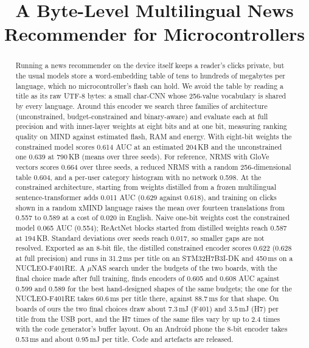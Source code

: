 \documentclass{llncs}
\begin{document}
\title{A Byte-Level Multilingual News Recommender for Microcontrollers}
\author{}
\authorrunning{}
\institute{}
\maketitle
\pagestyle{empty}
\thispagestyle{empty}

\begin{abstract}
Running a news recommender on the device itself keeps a reader's clicks private,
but the usual models store a word-embedding table of tens to hundreds of megabytes
per language, which no microcontroller's flash can hold. We avoid the table by
reading a title as its raw UTF-8 bytes: a small char-CNN whose 256-value
vocabulary is shared by every language. Around this encoder we search three
families of architecture (unconstrained, budget-constrained and binary-aware) and
evaluate each at full precision and with inner-layer weights at eight bits and at
one bit, measuring ranking quality on MIND against estimated flash, RAM and
energy. With eight-bit weights the constrained model scores 0.614 AUC at an
estimated 204\,KB and the unconstrained one 0.639 at 790\,KB (means over three
seeds). For reference,
NRMS with GloVe vectors scores 0.664 over three seeds, a reduced NRMS with a
random 256-dimensional table 0.604, and a per-user category histogram with no
network 0.598. At the constrained architecture, starting from weights distilled
from a frozen multilingual sentence-transformer adds 0.011 AUC (0.629 against
0.618), and training on clicks shown in a random xMIND language raises the mean
over fourteen translations from 0.557 to 0.589 at a cost of 0.020 in English.
Naive one-bit weights cost the constrained model 0.065 AUC (0.554); ReActNet
blocks started from distilled weights reach 0.587 at 194\,KB.
Standard deviations over seeds reach 0.017, so smaller gaps are not resolved. Exported as an
8-bit file, the distilled constrained encoder scores 0.622 (0.628 at full
precision) and runs in 31.2\,ms per title on an STM32H7B3I-DK and 450\,ms on a
NUCLEO-F401RE. A $\mu$NAS search under the budgets of the two boards, with the
final choice made after full training, finds encoders of 0.605 and 0.608 AUC
against 0.599 and 0.589 for the best hand-designed shapes of the same budgets;
the one for the NUCLEO-F401RE takes 60.6\,ms per title there, against 88.7\,ms
for that shape. On boards of ours the two final choices draw about 7.3\,mJ (F401)
and 3.5\,mJ (H7) per title from the USB port, and the H7 times of the same files
vary by up to 2.4 times with the code generator's buffer layout. On an Android
phone the 8-bit encoder takes 0.53\,ms and about 0.95\,mJ per title. Code and
artefacts are released.
\end{abstract}
\end{document}
